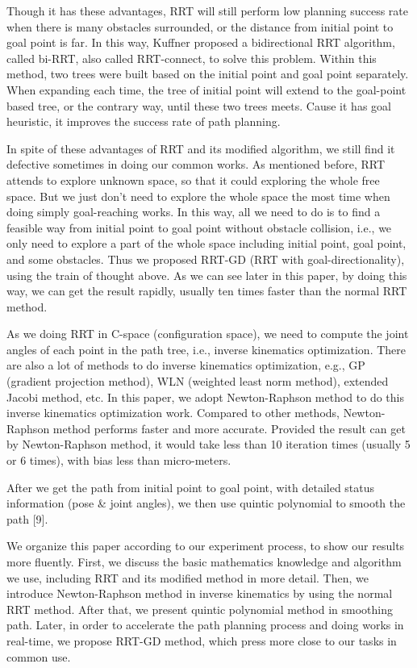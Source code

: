 \documentclass[letterpaper, 10 pt, conference]{ieeeconf}  %
\begin{document}
Though it has these advantages, RRT will still perform low planning success rate when there is many obstacles surrounded, or the distance from initial point to goal point is far. In this way, Kuffner proposed a bidirectional RRT algorithm, called bi-RRT, also called RRT-connect, to solve this problem. Within this method, two trees were built based on the initial point and goal point separately. When expanding each time, the tree of initial point will extend to the goal-point based tree, or the contrary way, until these two trees meets. Cause it has goal heuristic, it improves the success rate of path planning.  

In spite of these advantages of RRT and its modified algorithm, we still find it defective sometimes in doing our common works. As mentioned before, RRT attends to explore unknown space, so that it could exploring the whole free space. But we just don’t need to explore the whole space the most time when doing simply goal-reaching works. In this way, all we need to do is to find a feasible way from initial point to goal point without obstacle collision, i.e., we only need to explore a part of the whole space including initial point, goal point, and some obstacles. Thus we proposed RRT-GD (RRT with goal-directionality), using the train of thought above. As we can see later in this paper, by doing this way, we can get the result rapidly, usually ten times faster than the normal RRT method.

As we doing RRT in C-space (configuration space), we need to compute the joint angles of each point in the path tree, i.e., inverse kinematics optimization. There are also a lot of methods to do inverse kinematics optimization, e.g., GP (gradient projection method), WLN (weighted least norm	 method), extended Jacobi method, etc. In this paper, we adopt Newton-Raphson method to do this inverse kinematics optimization work. Compared to other methods, Newton-Raphson method performs faster and more accurate. Provided the result can get by Newton-Raphson method, it would take less than 10 iteration times (usually 5 or 6 times), with bias less than micro-meters. 

After we get the path from initial point to goal point, with detailed status information (pose \& joint angles), we then use quintic polynomial to smooth the path [9]. 

We organize this paper according to our experiment process, to show our results more fluently. First, we discuss the basic mathematics knowledge and algorithm we use, including RRT and its modified method in more detail. Then, we introduce Newton-Raphson method in inverse kinematics by using the normal RRT method. After that, we present quintic polynomial method in smoothing path. Later, in order to accelerate the path planning process and doing works in real-time, we propose RRT-GD method, which press more close to our tasks in common use.
\end{document}
